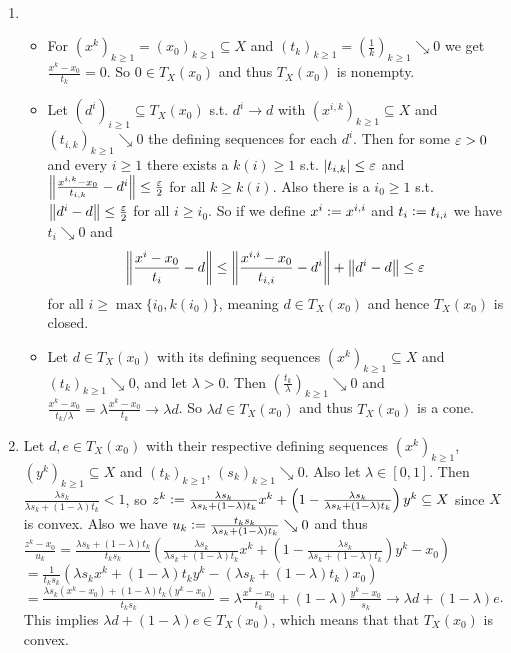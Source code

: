 \begin{solution}
    ~
    \begin{enumerate}
        \item \begin{itemize}
            \item For \((x^k)_{k \ge 1} = (x_0)_{k \ge 1} \subseteq X\) and \((t_k)_{k \ge 1} = (\frac{1}{k})_{k \ge 1} \searrow 0\) we get \(\frac{x^k - x_0}{t_k} = 0\). So \(0 \in T_X(x_0)\) and thus \(T_X(x_0)\) is nonempty.
            
            \item Let \((d^i)_{i \ge 1} \subseteq T_X(x_0)\) s.t. \(d^i \to d\) with \((x^{i,k})_{k \ge 1} \subseteq X\) and \((t_{i,k})_{k \ge 1} \searrow 0\) the defining sequences for each \(d^i\). Then for some \(\varepsilon > 0\) and every \(i \ge 1\) there exists a \(k(i) \ge 1\) s.t. \(\left| t_{i,k} \right| \le \varepsilon\) and \(\left\| \frac{x^{i,k} - x_0}{t_{i,k}} - d^i \right\| \le \frac{\varepsilon}{2}\) for all \(k \ge k(i)\). Also there is a \(i_0 \ge 1\) s.t. \(\left\| d^i - d \right\| \le \frac{\varepsilon}{2}\) for all \(i \ge i_0\).
            So if we define \(x^i \mathrel{\mathop:}= x^{i,i}\) and \(t_i \mathrel{\mathop:}= t_{i,i}\) we have \(t_i \searrow 0\) and \[\left\| \frac{x^i - x_0}{t_i} - d \right\| \le \left\| \frac{x^{i,i} - x_0}{t_{i,i}} - d^i \right\| + \left\| d^i - d \right\| \le \varepsilon\] for all \(i \ge \max\{i_0, k(i_0)\}\), meaning \(d \in T_X(x_0)\) and hence \(T_X(x_0)\) is closed.

            \item Let \(d \in T_X(x_0)\) with its defining sequences \((x^k)_{k \ge 1} \subseteq X\) and \((t_k)_{k \ge 1} \searrow 0\), and let \(\lambda > 0\). Then \((\frac{t_k}{\lambda})_{k \ge 1} \searrow 0\) and \(\frac{x^k - x_0}{t_k / \lambda} = \lambda \frac{x^k - x_0}{t_k} \to \lambda d\). So \(\lambda d \in T_X(x_0)\) and thus \(T_X(x_0)\) is a cone.
        \end{itemize}

        \item Let \(d, e \in T_X(x_0)\) with their respective defining sequences \((x^k)_{k \ge 1}\), \((y^k)_{k \ge 1} \subseteq X\) and \((t_k)_{k \ge 1}\), \((s_k)_{k \ge 1} \searrow 0\). Also let \(\lambda \in [0, 1]\). Then \(\frac{\lambda s_k}{\lambda s_k + (1-\lambda) t_k} < 1\), so \(z^k \mathrel{\mathop:}= \frac{\lambda s_k}{\lambda s_k + (1-\lambda) t_k} x^k + \left(1-\frac{\lambda s_k}{\lambda s_k + (1-\lambda) t_k}\right) y^k \subseteq X\) since \(X\) is convex. Also we have \(u_k \mathrel{\mathop:}= \frac{t_k s_k}{\lambda s_k + (1-\lambda) t_k} \searrow 0\) and thus \(\frac{z^k - x_0}{u_k} = \frac{\lambda s_k + (1-\lambda) t_k}{t_k s_k} \left( \frac{\lambda s_k}{\lambda s_k + (1-\lambda) t_k} x^k + \left(1-\frac{\lambda s_k}{\lambda s_k + (1-\lambda) t_k}\right) y^k - x_0 \right)\) \\
        \(= \frac{1}{t_k s_k} \left( \lambda s_k x^k + (1-\lambda) t_k y^k - \left( \lambda s_k + (1-\lambda) t_k \right) x_0 \right)\) \\
        \(= \frac{\lambda s_k (x^k - x_0) + (1-\lambda) t_k (y^k - x_0)}{t_k s_k} = \lambda \frac{x^k - x_0}{t_k} + (1-\lambda) \frac{y^k - x_0}{s_k} \to \lambda d + (1-\lambda) e\). This implies \(\lambda d + (1-\lambda) e \in T_X(x_0)\), which means that that \(T_X(x_0)\) is convex.


\end{enumerate}
\end{solution}
